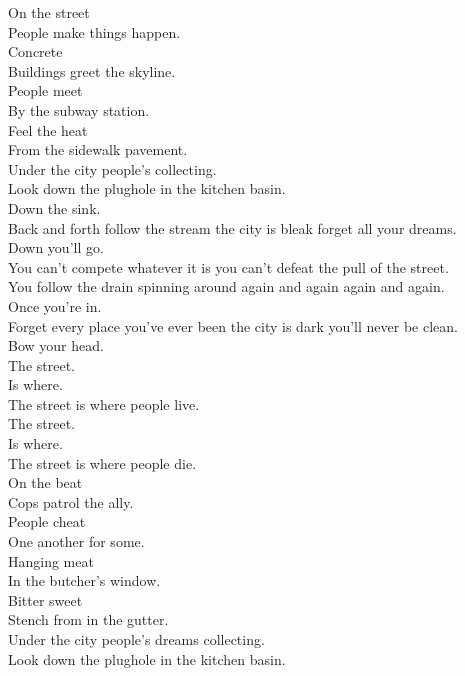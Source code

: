 


On the street \\
People make things happen. \\
Concrete \\
Buildings greet the skyline. \\
People meet \\
By the subway station. \\
Feel the heat \\
From the sidewalk pavement. \\
Under the city people's  collecting. \\
Look down the plughole in the kitchen basin. \\

Down the sink. \\
Back and forth follow the stream the city is bleak forget all your dreams. \\
Down you'll go. \\
You can't compete whatever it is you can't defeat the pull of the street. \\
You follow the drain spinning around again and again again and again. \\
Once you're in. \\
Forget every place you've ever been the city is dark you'll never be clean. \\
Bow your head. \\

The street. \\
Is where. \\
The street is where people live. \\
The street. \\
Is where. \\
The street is where people die. \\

On the beat \\
Cops patrol the ally. \\
People cheat \\
One another for some. \\
Hanging meat \\
In the butcher's window. \\
Bitter sweet \\
Stench from in the gutter. \\
Under the city people's dreams collecting. \\
Look down the plughole in the kitchen basin. \\

